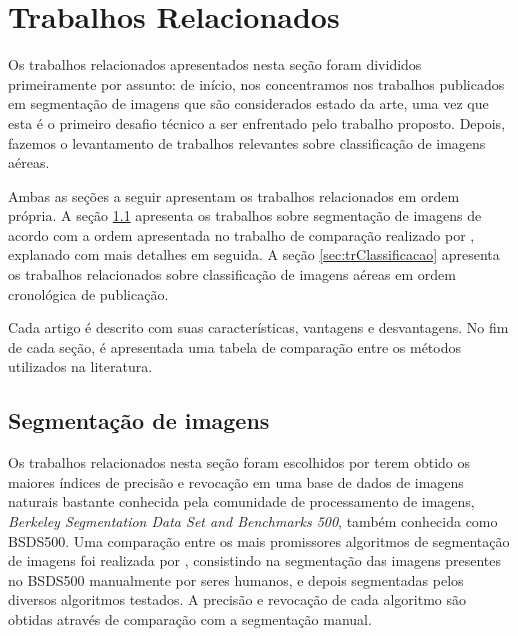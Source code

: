\chapter{Trabalhos Relacionados}\label{cap:trabalhos}


Os trabalhos relacionados apresentados nesta seção foram divididos primeiramente por assunto: de início, nos concentramos nos trabalhos publicados em segmentação de imagens que são considerados estado da arte, uma vez que esta é o primeiro desafio técnico a ser enfrentado pelo trabalho proposto. Depois, fazemos o levantamento de trabalhos relevantes sobre classificação de imagens aéreas.

Ambas as seções a seguir apresentam os trabalhos relacionados em ordem própria. A seção \ref{sec:trSegmentacao} apresenta os trabalhos sobre segmentação de imagens de acordo com a ordem apresentada no trabalho de comparação realizado por , explanado com mais detalhes em seguida. A seção \ref{sec:trClassificacao} apresenta os trabalhos relacionados sobre classificação de imagens aéreas em ordem cronológica de publicação.

Cada artigo é descrito com suas características, vantagens e desvantagens. No fim de cada seção, é apresentada uma tabela de comparação entre os métodos utilizados na literatura.

\section{Segmentação de imagens}\label{sec:trSegmentacao}


Os trabalhos relacionados nesta seção foram escolhidos por terem obtido os maiores índices de precisão e revocação em uma base de dados de imagens naturais bastante conhecida pela comunidade de processamento de imagens, \textit{Berkeley Segmentation Data Set and Benchmarks 500}, também conhecida como BSDS500. Uma comparação entre os mais promissores algoritmos de segmentação de imagens foi realizada por , consistindo na segmentação das imagens presentes no BSDS500 manualmente por seres humanos, e depois segmentadas pelos diversos algoritmos testados. A precisão e revocação de cada algoritmo são obtidas através de comparação com a segmentação manual.

